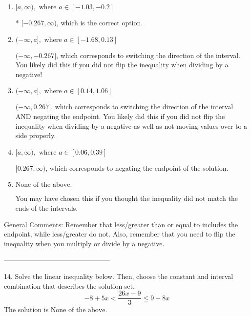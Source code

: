 \documentclass{extbook}[14pt]
\begin{document}
\begin{enumerate}[label=\Alph*.] 
\item $ [a, \infty), \text{ where } a \in [-1.03, -0.2] $ 

 * $[-0.267, \infty)$, which is the correct option. 
\item $ (-\infty, a], \text{ where } a \in [-1.68, 0.13] $ 

  $(-\infty, -0.267]$, which corresponds to switching the direction of the interval. You likely did this if you did not flip the inequality when dividing by a negative! 
\item $ (-\infty, a], \text{ where } a \in [0.14, 1.06] $ 

  $(-\infty, 0.267]$, which corresponds to switching the direction of the interval AND negating the endpoint. You likely did this if you did not flip the inequality when dividing by a negative as well as not moving values over to a side properly. 
\item $ [a, \infty), \text{ where } a \in [0.06, 0.39] $ 

  $[0.267, \infty)$, which corresponds to negating the endpoint of the solution. 
\item $ \text{None of the above}. $ 

 You may have chosen this if you thought the inequality did not match the ends of the intervals. 
\end{enumerate} 
 
General Comments: Remember that less/greater than or equal to includes the endpoint, while less/greater do not. Also, remember that you need to flip the inequality when you multiply or divide by a negative.

-----------------------------------------------

14. Solve the linear inequality below. Then, choose the constant and interval combination that describes the solution set.
\[ -8 + 5 x < \frac{26 x - 9}{3} \leq 9 + 8 x \] 
The solution is $ \text{None of the above.} $ 
\end{document}
